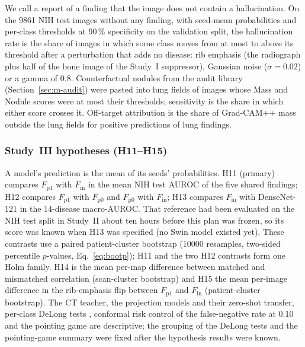 We call a report of a finding that the image does not contain a hallucination. On the \num{9861} NIH test images without any finding, with
seed-mean probabilities and per-class thresholds at 90\,\% specificity on the validation split, the hallucination rate is the share of
images in which some class moves from at most to above its threshold after a perturbation that adds no disease: rib emphasis (the
radiograph plus half of the bone image of the Study~I suppressor), Gaussian noise ($\sigma=0.02$) or a gamma of 0.8. Counterfactual nodules
from the audit library (Section~\ref{sec:m-audit}) were pasted into lung fields of images whose Mass and Nodule scores were at most their
thresholds; sensitivity is the share in which either score crosses it. Off-target attribution is the share of Grad-CAM++ mass outside the
lung fields for positive predictions of lung findings.

\subsubsection{Study~III hypotheses (H11--H15)}
A model's prediction is the mean of its seeds' probabilities. H11 (primary) compares $F_{\mathrm{p1}}$ with $F_{\mathrm{in}}$ in the mean
NIH test AUROC of the five shared findings; H12 compares $F_{\mathrm{p1}}$ with $F_{\mathrm{p0}}$ and $F_{\mathrm{p0}}$ with
$F_{\mathrm{in}}$; H13 compares $F_{\mathrm{in}}$ with DenseNet-121 in the 14-disease macro-AUROC. That reference had been evaluated on the
NIH test split in Study~II about ten hours before this plan was frozen, so its score was known when H13 was specified (no Swin model existed
yet). These contrasts use a paired patient-cluster bootstrap (\num{10000} resamples, two-sided percentile $p$-values, Eq.~\eqref{eq:bootp});
H11 and the two H12 contrasts form one Holm family. H14 is the mean per-map difference between matched and mismatched correlation
(scan-cluster bootstrap) and H15 the mean per-image difference in the rib-emphasis flip between $F_{\mathrm{p1}}$ and $F_{\mathrm{in}}$
(patient-cluster bootstrap). The CT teacher, the projection models and their zero-shot transfer, per-class DeLong tests
\cite{delong1988auc}, conformal risk control of the false-negative rate at 0.10 \cite{angelopoulos2022crc} and the pointing game are
descriptive; the grouping of the DeLong tests and the pointing-game summary were fixed after the hypothesis results were known.
